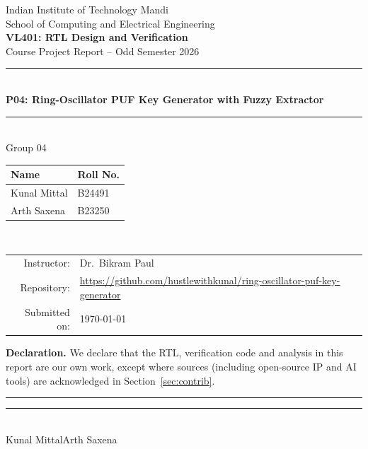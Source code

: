 \documentclass[11pt,a4paper]{article}
\newcommand{\groupno}{04}                         %
\newcommand{\projno}{P04}
\newcommand{\projtitle}{Ring-Oscillator PUF Key Generator with Fuzzy Extractor}
\newcommand{\studentA}{Kunal Mittal}            %
\newcommand{\rollA}{B24491}                       %
\newcommand{\studentB}{Arth Saxena}               %
\newcommand{\rollB}{B23250}                       %
\newcommand{\repourl}{https://github.com/hustlewithkunal/ring-oscillator-puf-key-generator}
\newcommand{\submitdate}{\today}
\begin{document}
\begin{titlepage}
\centering
{\large Indian Institute of Technology Mandi}\\[2pt]
{\normalsize School of Computing and Electrical Engineering}\\[1.6cm]
{\Large\bfseries VL401: RTL Design and Verification}\\[4pt]
{\large Course Project Report -- Odd Semester 2026}\\[1.6cm]
{\color{iitblue}\rule{\linewidth}{1pt}}\\[8pt]
{\LARGE\bfseries \projno: \projtitle}\\[8pt]
{\color{iitblue}\rule{\linewidth}{1pt}}\\[1.4cm]
{\large Group \groupno}\\[10pt]
\begin{tabular}{ll}
\toprule
\textbf{Name} & \textbf{Roll No.}\\
\midrule
\studentA & \rollA\\
\studentB & \rollB\\
\bottomrule
\end{tabular}\\[1.2cm]
\begin{tabular}{rl}
Instructor: & Dr.\ Bikram Paul\\
Repository: & \url{\repourl}\\
Submitted on: & \submitdate\\
\end{tabular}
\vfill
\begin{minipage}{0.92\linewidth}\small
\textbf{Declaration.} We declare that the RTL, verification code and analysis in this report are our own
work, except where sources (including open-source IP and AI tools) are acknowledged in
Section~\ref{sec:contrib}.\\[1.0cm]
\rule{5.5cm}{0.4pt}\hfill\rule{5.5cm}{0.4pt}\\
\studentA\hfill\studentB
\end{minipage}
\end{titlepage}
\end{document}
